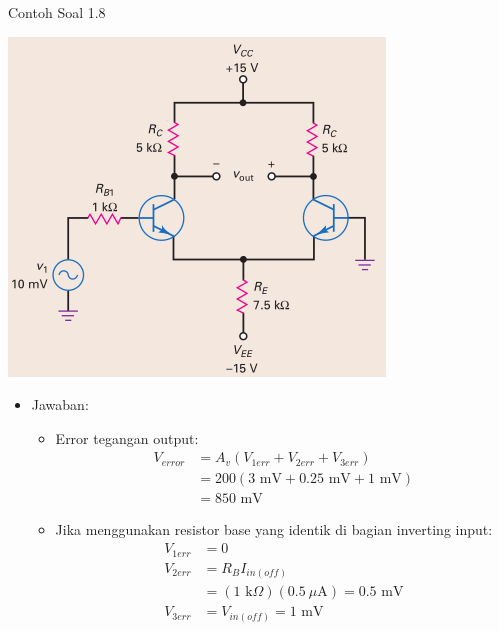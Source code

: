 \documentclass[aspectratio=169]{beamer}
\begin{document}
\begin{frame}{Contoh Soal 1.8}
	\begin{multicols}{2}
		\begin{center}
			\includegraphics[height=0.7\textheight]{gambar/01.latihan_soal_8}
		\end{center}
		\columnbreak
		\begin{itemize}
			\item Jawaban:
			\begin{itemize}
				\item Error tegangan output:
				\begin{align*}
					V_{error} &= A_v (V_{1err} + V_{2err} + V_{3err}) \\
					&= 200(3 \text{ mV} + 0.25 \text{ mV} + 1 \text{ mV}) \\
					&= 850 \text{ mV}
				\end{align*}
			\end{itemize}
			\begin{itemize}
				\item Jika menggunakan resistor base yang identik di bagian inverting input:
				\begin{align*}
					V_{1err} &= 0 \\
					V_{2err} &= R_{B}I_{in(off)} \\
					&= (1 \text{ k}\Omega)(0.5~\mu\text{A}) = 0.5 \text{ mV} \\
					V_{3err} &= V_{in(off)} = 1 \text{ mV}
				\end{align*}
			\end{itemize}
		\end{itemize}
	\end{multicols}
\end{frame}
\end{document}
